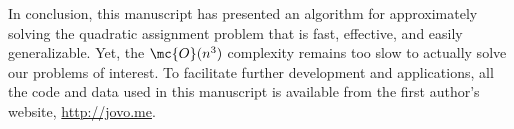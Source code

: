 \documentclass[10pt,journal,cspaper,compsoc]{IEEEtran}
\begin{document}
In conclusion, this manuscript has presented an algorithm for approximately solving the quadratic assignment problem that is fast, effective, and easily generalizable.  Yet, the $\mc{O}(n^3)$ complexity remains too slow to actually solve our problems of interest.  To facilitate further development and applications, all the code and data used in this manuscript is available from the first author's website, \url{http://jovo.me}.

% 
% 
% 
% 
\end{document}

